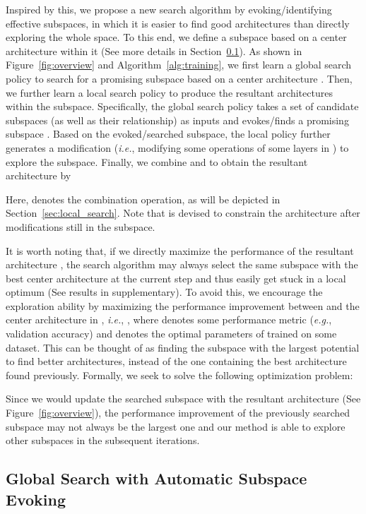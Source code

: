 \documentclass[lettersize,journal]{IEEEtran}
\def\eg{\emph{e.g.}} \def\Eg{\emph{E.g.}}
\def\ie{\emph{i.e.}} \def\Ie{\emph{I.e.}}
\begin{document}
Inspired by this, we propose a new search algorithm by evoking/identifying effective subspaces, in which 
it is easier to find good architectures than directly exploring the whole space.
To this end, we define a subspace  based on a center architecture  within it (See more details in Section~\ref{sec:global_search}).
As shown in Figure~\ref{fig:overview} and Algorithm~\ref{alg:training}, we first learn a global search policy  to search for a promising subspace  based on a center architecture .
Then, we further learn a local search policy  to produce the resultant architectures within the subspace.
Specifically, the global search policy  takes a set of candidate subspaces  (as well as their relationship) as inputs and evokes/finds a promising subspace .
Based on the evoked/searched subspace, the local policy  further generates a modification  (\ie, modifying some operations of some layers in ) to explore the subspace.
Finally, we combine  and  to obtain the resultant architecture by

Here,  denotes the combination operation, as will be depicted in Section~\ref{sec:local_search}.
Note that  is devised to constrain the architecture after modifications still in the subspace.

It is worth noting that, if we directly maximize the performance of the resultant architecture , the search algorithm may always select the same subspace with the best center architecture at the current step and thus easily get stuck in a local optimum (See results in supplementary). To avoid this, we encourage the exploration ability by maximizing the performance improvement between  and the center architecture  in , \ie, ,
where  denotes some performance metric (\eg, validation accuracy) and  denotes the optimal parameters of  trained on some dataset.
This can be thought of as finding the subspace with the largest potential to find better architectures, instead of the one containing the best architecture found previously.
Formally, we seek to solve the following optimization problem:

Since we would update the searched subspace with the resultant architecture  (See Figure~\ref{fig:overview}), the performance improvement of the previously searched subspace may not always be the largest one and our method is able to explore other subspaces in the subsequent iterations.

\subsection{Global Search with Automatic Subspace Evoking}
\label{sec:global_search}
\end{document}
